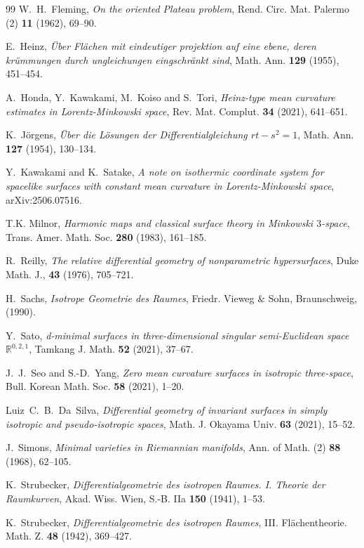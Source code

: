 \documentclass[12pt,a4paper,reqno]{amsart}
\theoremstyle{plain} %
\theoremstyle{definition}
\begin{document}
\begin{thebibliography}{99}
W.~H.~Fleming, {\it On the oriented Plateau problem}, Rend. Circ. Mat. Palermo (2) {\bf 11} (1962), 69--90.

E.~Heinz, {\it \"Uber Fl\"achen mit eindeutiger projektion auf eine ebene, deren kr\"ummungen 
durch ungleichungen eingschr\"ankt sind},  Math. Ann. {\bf 129} (1955), 451--454.

A.~Honda, Y.~Kawakami, M.~Koiso and S.~Tori, {\it Heinz-type mean curvature estimates in Lorentz-Minkowski space}, Rev. Mat. Complut. {\bf 34} (2021), 641--651.

K.~J\"orgens, \emph{\"Uber die L\"osungen der Differentialgleichung $rt-s^2=1$}, Math. Ann. {\bf 127} (1954), 130--134.

Y.~Kawakami and K.~Satake, {\it A note on isothermic coordinate system for spacelike surfaces with constant mean curvature in Lorentz-Minkowski space}, arXiv:2506.07516.

T.K. Milnor, \emph{Harmonic maps and classical surface theory in Minkowski $3$-space}, Trans. Amer. Math. Soc. {\bf 280} (1983), 161--185.

R.~Reilly, \emph{ The relative differential geometry of nonparametric hypersurfaces}, Duke Math. J., {\bf 43} (1976), 705--721.

H.~Sachs, {\it Isotrope Geometrie des Raumes}, Friedr. Vieweg \& Sohn, Braunschweig, (1990).

Y.~Sato, {\it d-minimal surfaces in three-dimensional singular semi-Euclidean space $\mathbb{R}^{0,2,1}$}, Tamkang J. Math. {\bf 52} (2021), 37--67. 

J.~J.~Seo and S.-D.~Yang, {\it Zero mean curvature surfaces in isotropic three-space}, Bull. Korean Math. Soc. {\bf 58} (2021), 1--20. 

Luiz~C.~B.~Da~Silva, {\it Differential geometry of invariant surfaces in simply isotropic and pseudo-isotropic spaces}, Math. J. Okayama Univ. {\bf 63} (2021), 15--52. 

J.~Simons, {\it Minimal varieties in Riemannian manifolds}, Ann. of Math. (2) {\bf 88} (1968), 62--105.

K.~Strubecker, {\it Differentialgeometrie des isotropen Raumes. I. Theorie der Raumkurven}, Akad. Wiss. Wien, S.-B. IIa {\bf 150} (1941), 1--53.

K.~Strubecker, {\it Differentialgeometrie des isotropen Raumes}, III. Fl\"achentheorie. Math. Z. {\bf 48} (1942), 369--427.


\end{thebibliography}
\end{document}
